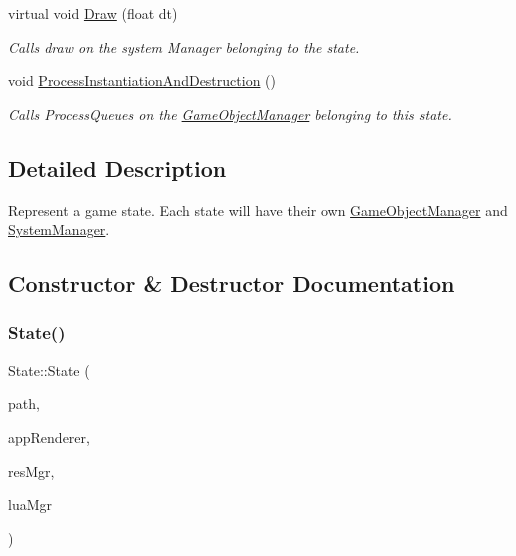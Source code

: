 \begin{DoxyCompactItemize}
virtual void \hyperlink{classState_aacc5a196dc56e926051517bb0eb86f7c}{Draw} (float dt)
\begin{DoxyCompactList}\small\item\em Calls draw on the system Manager belonging to the state. \end{DoxyCompactList}\item 
\mbox{\label{classState_ad0fd1771625e07bcddaf2dc7a52a5b19}} 
void \hyperlink{classState_ad0fd1771625e07bcddaf2dc7a52a5b19}{Process\+Instantiation\+And\+Destruction} ()
\begin{DoxyCompactList}\small\item\em Calls Process\+Queues on the \hyperlink{classGameObjectManager}{Game\+Object\+Manager} belonging to this state. \end{DoxyCompactList}\end{DoxyCompactItemize}


\subsection{Detailed Description}
Represent a game state. Each state will have their own \hyperlink{classGameObjectManager}{Game\+Object\+Manager} and \hyperlink{classSystemManager}{System\+Manager}. 

\subsection{Constructor \& Destructor Documentation}
\mbox{\label{classState_a935578b20d60c6ed193e96ceec1201be}} 
\subsubsection{\texorpdfstring{State()}{State()}}
{\footnotesize\ttfamily State\+::\+State (\begin{DoxyParamCaption}\item[{std\+::string const \&}]{path,  }\item[{\hyperlink{classAppRenderer}{App\+Renderer} $\ast$}]{app\+Renderer,  }\item[{\hyperlink{classResourceManager}{Resource\+Manager} $\ast$}]{res\+Mgr,  }\item[{\hyperlink{classScriptingManager}{Scripting\+Manager} $\ast$}]{lua\+Mgr }\end{DoxyParamCaption})}



